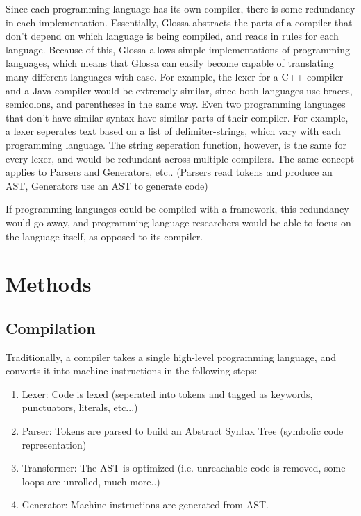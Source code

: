 \documentclass{article}
\begin{document}
Since each programming language has its own compiler, there is some redundancy in each implementation. 
Essentially, Glossa abstracts the parts of a compiler that don't depend on which language is being compiled, and reads in rules for each language.
Because of this, Glossa allows simple implementations of programming languages, which means that Glossa can easily become capable of translating many different languages with ease.
For example, the lexer for a C++ compiler and a Java compiler would be extremely similar, since both languages use braces, semicolons, and parentheses in the same way.
Even two programming languages that don't have similar syntax have similar parts of their compiler. 
For example, a lexer seperates text based on a list of delimiter-strings, which vary with each programming language. The string seperation function, however, is the same for every lexer, and would be redundant across multiple compilers.
The same concept applies to Parsers and Generators, etc.. (Parsers read tokens and produce an AST, Generators use an AST to generate code)

If programming languages could be compiled with a framework, this redundancy would go away, and programming language researchers would be able to focus on the language itself, as opposed to its compiler.

\section{Methods}

\subsection{Compilation}
Traditionally, a compiler takes a single high-level programming language, and converts it into machine instructions in the following steps:
\begin{enumerate}
\item Lexer: Code is lexed (seperated into tokens and tagged as keywords, punctuators, literals, etc...)
\item Parser: Tokens are parsed to build an Abstract Syntax Tree (symbolic code representation)
\item Transformer: The AST is optimized (i.e. unreachable code is removed, some loops are unrolled, much more..)
\item Generator: Machine instructions are generated from AST.
\end{enumerate}
\end{document}
